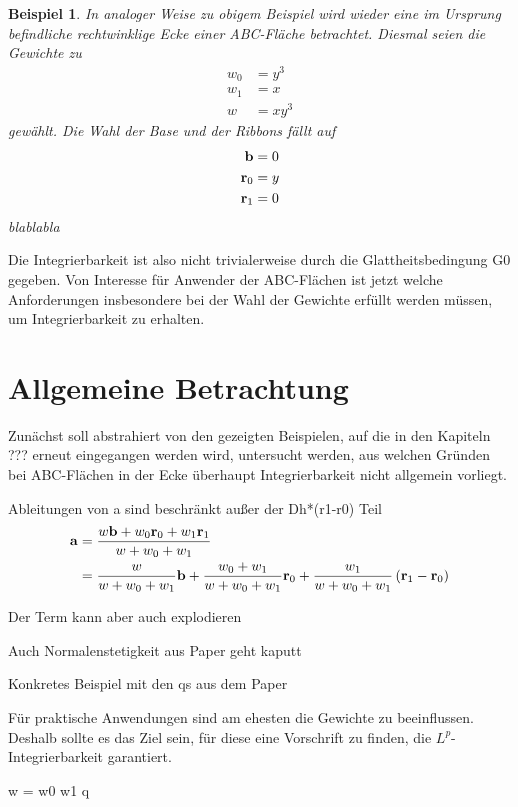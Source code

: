 \documentclass[10pt,a4paper,oneside]{report}
\newtheorem{beispiel}{Beispiel}[chapter]
\begin{document}
\begin{beispiel}
In analoger Weise zu obigem Beispiel wird wieder eine im Ursprung befindliche rechtwinklige Ecke einer ABC-Fläche betrachtet.
Diesmal seien die Gewichte zu
\begin{align*}
w_0 &= y^3 \\
w_1 &= x \\
w &= xy^3
\end{align*}
gewählt.
Die Wahl der Base und der Ribbons fällt auf 
\begin{align*}
\bold{b} &= 0 \\
\bold{r}_0 &= y \\
\bold{r}_1 &= 0 
\end{align*}
blablabla
\end{beispiel}

Die Integrierbarkeit ist also nicht trivialerweise durch die Glattheitsbedingung G0 gegeben.
Von Interesse für Anwender der ABC-Flächen ist jetzt welche Anforderungen insbesondere bei der Wahl der Gewichte erfüllt werden müssen, um Integrierbarkeit zu erhalten.

\chapter{Allgemeine Betrachtung}

Zunächst soll abstrahiert von den gezeigten Beispielen, auf die in den Kapiteln ??? erneut eingegangen werden wird, untersucht werden, aus welchen Gründen bei ABC-Flächen in der Ecke überhaupt Integrierbarkeit nicht allgemein vorliegt.

Ableitungen von a sind beschränkt außer der Dh*(r1-r0) Teil
\begin{align*}
\bold{a} &= \frac{w\bold{b} + w_0 \bold{r}_0+ w_1 \bold{r}_1}{w + w_0 + w_1} \\
&= \frac{w}{w+w_0+w_1} \bold{b} + \frac{w_0 + w_1}{w+w_0+w_1} \bold{r}_0 + \frac{w_1}{w+w_0+w_1} \left(\bold{r}_1-\bold{r}_0\right)
\end{align*}


Der Term kann aber auch explodieren

Auch Normalenstetigkeit aus Paper geht kaputt

Konkretes Beispiel mit den qs aus dem Paper

Für praktische Anwendungen sind am ehesten die Gewichte zu beeinflussen.
Deshalb sollte es das Ziel sein, für diese eine Vorschrift zu finden, die $L^p$-Integrierbarkeit garantiert.

w = w0 w1 q
\end{document}
